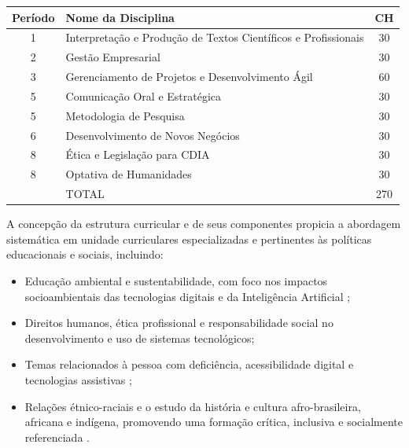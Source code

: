 \begin{quadro}[htb]
    \centering
    \caption{Unidades curriculares do Ciclo de Humanidades}
    \label{quadro:2.11}
    \begin{tabular}{|c|l|c|}
        \hline
        \textbf{Período} & \textbf{Nome da Disciplina} & \textbf{CH} \\ \hline
        1 & Interpretação e Produção de Textos Científicos e Profissionais & 30 \\ \hline
        2 & Gestão Empresarial & 30 \\ \hline
        3 & Gerenciamento de Projetos e Desenvolvimento Ágil & 60 \\ \hline
        5 & Comunicação Oral e Estratégica & 30 \\ \hline
        5 & Metodologia de Pesquisa & 30 \\ \hline
        6 & Desenvolvimento de Novos Negócios & 30 \\ \hline
        8 & Ética e Legislação para CDIA & 30 \\ \hline
        8 & Optativa de Humanidades & 30 \\ \hline
        & TOTAL & 270 \\ \hline
    \end{tabular}
\end{quadro}


A concepção da estrutura curricular e de seus componentes propicia a abordagem sistemática em unidade curriculares especializadas e pertinentes às políticas educacionais e sociais, incluindo:

\begin{itemize}
    \item Educação ambiental e sustentabilidade, com foco nos impactos socioambientais das tecnologias digitais e da Inteligência Artificial \cite{Brasil_1997};
    \item Direitos humanos, ética profissional e responsabilidade social no desenvolvimento e uso de sistemas tecnológicos;
    \item Temas relacionados à pessoa com deficiência, acessibilidade digital e tecnologias assistivas \cite{Brasil_2015_Deficiencia, Brasil_2011_Deficiencia};
    \item Relações étnico-raciais e o estudo da história e cultura afro-brasileira, africana e indígena, promovendo uma formação crítica, inclusiva e socialmente referenciada \cite{Brasil_Raciais_2004}.
\end{itemize}

